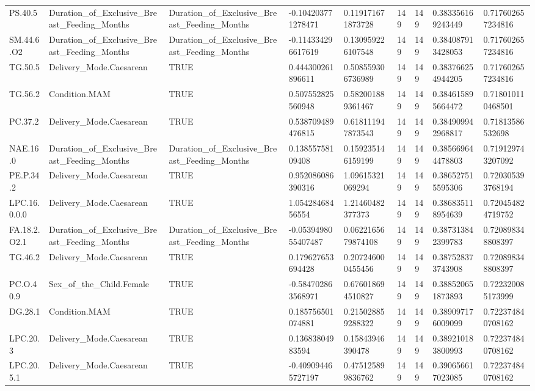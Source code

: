 \begin{longtable}{lllllllll}
PS.40.5 & Duration\_of\_Exclusive\_Breast\_Feeding\_Months & Duration\_of\_Exclusive\_Breast\_Feeding\_Months & -0.104203771278471 & 0.119171671873728 & 149 & 149 & 0.383356169243449 & 0.717602657234816 \\
SM.44.6.O2 & Duration\_of\_Exclusive\_Breast\_Feeding\_Months & Duration\_of\_Exclusive\_Breast\_Feeding\_Months & -0.114334296617619 & 0.130959226107548 & 149 & 149 & 0.384087913428053 & 0.717602657234816 \\
TG.50.5 & Delivery\_Mode.Caesarean & TRUE & 0.444300261896611 & 0.508559306736989 & 149 & 149 & 0.383766254944205 & 0.717602657234816 \\
TG.56.2 & Condition.MAM & TRUE & 0.507552825560948 & 0.582001889361467 & 149 & 149 & 0.384615895664472 & 0.718010110468501 \\
PC.37.2 & Delivery\_Mode.Caesarean & TRUE & 0.538709489476815 & 0.618111947873543 & 149 & 149 & 0.384909942968817 & 0.71813586532698 \\
NAE.16.0 & Duration\_of\_Exclusive\_Breast\_Feeding\_Months & Duration\_of\_Exclusive\_Breast\_Feeding\_Months & 0.13855758109408 & 0.159235146159199 & 149 & 149 & 0.385669644478803 & 0.719129743207092 \\
PE.P.34.2 & Delivery\_Mode.Caesarean & TRUE & 0.952086086390316 & 1.09615321069294 & 149 & 149 & 0.386527515595306 & 0.720305393768194 \\
LPC.16.0.0.0 & Delivery\_Mode.Caesarean & TRUE & 1.05428468456554 & 1.21460482377373 & 149 & 149 & 0.386835118954639 & 0.720454824719752 \\
FA.18.2.O2.1 & Duration\_of\_Exclusive\_Breast\_Feeding\_Months & Duration\_of\_Exclusive\_Breast\_Feeding\_Months & -0.0539498055407487 & 0.0622165679874108 & 149 & 149 & 0.387313842399783 & 0.720898348808397 \\
TG.46.2 & Delivery\_Mode.Caesarean & TRUE & 0.179627653694428 & 0.207246000455456 & 149 & 149 & 0.387528373743908 & 0.720898348808397 \\
PC.O.40.9 & Sex\_of\_the\_Child.Female & TRUE & -0.584702863568971 & 0.676018694510827 & 149 & 149 & 0.388520651873893 & 0.722320085173999 \\
DG.28.1 & Condition.MAM & TRUE & 0.185756501074881 & 0.215028859288322 & 149 & 149 & 0.389097176009099 & 0.722374840708162 \\
LPC.20.3 & Delivery\_Mode.Caesarean & TRUE & 0.13683804983594 & 0.15843946390478 & 149 & 149 & 0.389210183800993 & 0.722374840708162 \\
LPC.20.5.1 & Delivery\_Mode.Caesarean & TRUE & -0.409094465727197 & 0.475125899836762 & 149 & 149 & 0.390656617023085 & 0.722374840708162 \\

\end{longtable}
